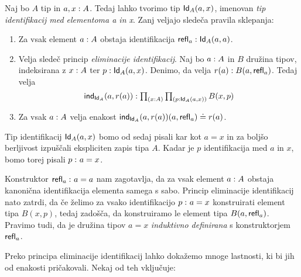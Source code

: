 \begin{definicija}
  Naj bo \(A\) tip in \(a, x : A\). Tedaj lahko tvorimo tip
  \(\textnormal{\textsf{Id}}_{A}(a, x)\),
  imenovan \emph{tip identifikacij med elementoma a in x}. Zanj veljajo sledeča pravila
  sklepanja:
  \begin{enumerate}
  \item Za vsak element \(a : A\) obstaja identifikacija
    \(\textnormal{\textsf{refl}}_{a} : \textnormal{\textsf{Id}}_{A}(a, a)\).
  \item Velja sledeč princip \emph{eliminacije identifikacij}.
    Naj bo \(a : A\) in \(B\) družina tipov, indeksirana z
    \(x : A\) ter \(p : \textnormal{\textsf{Id}}_{A}(a, x)\). Denimo, da velja
    \(r(a) : B(a, \textnormal{\textsf{refl}}_{a})\). Tedaj velja
    \[\textnormal{\textsf{ind}}_{\textnormal{\textsf{Id}}_{A}}(a, r(a)) : \textstyle \prod_{\left( x : A \right)} \textstyle \prod_{\left( p : \textnormal{\textsf{Id}}_{A}(a, x) \right)} B(x, p)\]
  \item Za vsak \(a : A\) velja enakost
    \(\textnormal{\textsf{ind}}_{\textnormal{\textsf{Id}}_{A}}(a, r(a))(a, \textnormal{\textsf{refl}}_{a}) \doteq r(a)\).
  \end{enumerate}
  Tip identifikacij \(\textnormal{\textsf{Id}}_{A}(a, x)\) bomo od sedaj pisali kar kot \(a = x\) in za boljšo
  berljivost izpuščali ekspliciten zapis tipa \(A\). Kadar je \(p\) identifikacija
  med \(a\) in \(x\), bomo torej pisali \(p \,\colon a = x\).

  Konstruktor \(\textnormal{\textsf{refl}}_{a} \,\colon a = a\)
  nam zagotavlja, da za vsak element \(a : A\) obstaja kanonična
  identifikacija elementa samega s sabo. Princip eliminacije identifikacij nato zatrdi,
  da če želimo za vsako identifikacijo \(p \,\colon a = x\) konstruirati element tipa
  \(B(x, p)\), tedaj zadošča, da konstruiramo le element tipa \(B(a, \textnormal{\textsf{refl}}_{a})\).
  Pravimo tudi, da je družina tipov \(a = x\) \emph{induktivno definirana} s
  konstruktorjem \(\textnormal{\textsf{refl}}_{a}\).
\end{definicija}

Preko principa eliminacije identifikacij lahko dokažemo mnoge lastnosti, ki bi jih od enakosti pričakovali. Nekaj od teh vključuje:

